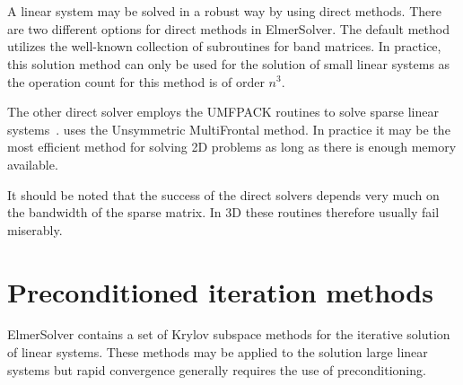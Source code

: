 \begin{versiona}
%
 
 
\section{}

A linear system may be solved in a robust way by using direct methods. 
There are two different options for direct methods in ElmerSolver. 
The default method utilizes the well-known  collection
of subroutines for band matrices. In practice, 
this solution method can only be used for the solution of small linear systems as 
the operation count for this method is of order $n^3$.

The other direct solver employs the UMFPACK
routines to solve sparse linear systems~\cite{umfpack1}.
 uses the Unsymmetric MultiFrontal method.
In practice it may be the most efficient method for solving 
2D problems as long as there is enough memory available.

It should be noted that the success of the direct solvers 
depends very much on the bandwidth of the sparse matrix. 
In 3D these routines therefore usually fail miserably.


\section{Preconditioned iteration methods}

ElmerSolver contains a set of Krylov subspace methods for the 
iterative solution of linear systems. These methods may be applied to the
solution large linear systems but rapid convergence generally requires
the use of preconditioning.


\end{versiona}

